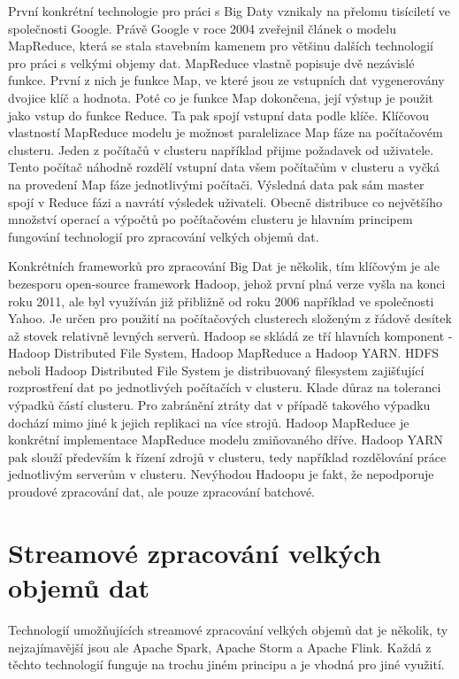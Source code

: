 \documentclass[thesis=B,czech]{FITthesis}[2012/06/26]
\begin{document}
	První konkrétní technologie pro práci s Big Daty vznikaly na přelomu tisíciletí ve společnosti Google. Právě Google v roce 2004 zveřejnil článek o modelu MapReduce\cite{https://gigaom.com/2013/03/04/the-history-of-hadoop-from-4-nodes-to-the-future-of-data/}, která se stala stavebním kamenem pro většinu dalších technologií pro práci s velkými objemy dat. MapReduce vlastně popisuje dvě nezávislé funkce. První z nich je funkce Map, ve které jsou ze vstupních dat vygenerovány dvojice klíč a hodnota. Poté co je funkce Map dokončena, její výstup je použit jako vstup do funkce Reduce. Ta pak spojí vstupní data podle klíče\cite{https://www-01.ibm.com/software/data/infosphere/hadoop/mapreduce/}. Klíčovou vlastností MapReduce modelu je možnost paralelizace Map fáze na počítačovém clusteru. Jeden z počítačů v clusteru například přijme požadavek od uživatele. Tento počítač náhodně rozdělí vstupní data všem počítačům v clusteru a vyčká na provedení Map fáze jednotlivými počítači. Výsledná data pak sám master spojí v Reduce fázi a navrátí výsledek uživateli. Obecně distribuce co největšího množství operací a výpočtů po počítačovém clusteru je hlavním principem fungování technologií pro zpracování velkých objemů dat. 
	
	Konkrétních frameworků pro zpracování Big Dat je několik, tím klíčovým je ale bezesporu open-source framework Hadoop, jehož první plná verze vyšla na konci roku 2011, ale byl využíván již přibližně od roku 2006 například ve společnosti Yahoo\cite{???}. Je určen pro použití na počítačových clusterech složeným z řádově desítek až stovek relativně levných serverů. Hadoop se skládá ze tří hlavních komponent - Hadoop Distributed File System, Hadoop MapReduce a Hadoop YARN. HDFS neboli Hadoop Distributed File System je distribuovaný filesystem zajišťující rozprostření dat po jednotlivých počítačích v clusteru. Klade důraz na toleranci výpadků částí clusteru. Pro zabránění ztráty dat v případě takového výpadku dochází mimo jiné k jejich replikaci na více strojů. Hadoop MapReduce je konkrétní implementace MapReduce modelu zmiňovaného dříve. Hadoop YARN pak slouží především k řízení zdrojů v clusteru, tedy například rozdělování práce jednotlivým serverům v clusteru. Nevýhodou Hadoopu je fakt, že nepodporuje proudové zpracování dat, ale pouze zpracování batchové. 


\section{Streamové zpracování velkých objemů dat}
	Technologií umožňujících streamové zpracování velkých objemů dat je několik, ty nejzajímavější jsou ale Apache Spark, Apache Storm a Apache Flink. Každá z těchto technologií funguje na trochu jiném principu a je vhodná pro jiné využití. 
	
\end{document}
